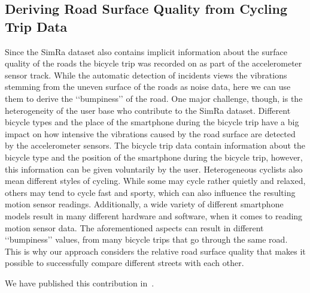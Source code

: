 \subsection{Deriving Road Surface Quality from Cycling Trip Data}
\label{subsec:road_surface_contribution}
Since the SimRa dataset also contains implicit information about the surface quality of the roads the bicycle trip was recorded on as part of the accelerometer sensor track.
While the automatic detection of incidents views the vibrations stemming from the uneven surface of the roads as noise data, here we can use them to derive the ‘‘bumpiness’’ of the road.
One major challenge, though, is the heterogeneity  of the user base who contribute to the SimRa dataset.
Different bicycle types and the place of the smartphone during the bicycle trip have a big impact on how intensive the vibrations caused by the road surface are detected by the accelerometer sensors.
The bicycle trip data contain information about the bicycle type and the position of the smartphone during the bicycle trip, however, this information can be given voluntarily by the user.
Heterogeneous cyclists also mean different styles of cycling.
While some may cycle rather quietly and relaxed, others may tend to cycle fast and sporty, which can also influence the resulting motion sensor readings.
Additionally, a wide variety of different smartphone models result in many different hardware and software, when it comes to reading motion sensor data.
The aforementioned aspects can result in different ‘‘bumpiness’’ values, from many bicycle trips that go through the same road.
This is why our approach considers the relative road surface quality that makes it possible to successfully compare different streets with each other.

We have published this contribution in~\cite{karakaya2023crowdsensing}.


